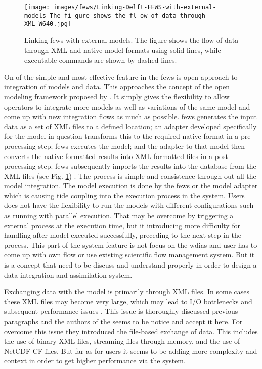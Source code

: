 \documentclass[a4paper,oneside,12pt]{report}
\begin{document}
\begin{figure}[htp]
    \centering
    \texttt{[image: images/fews/Linking-Delft-FEWS-with-external-models-The-fi-gure-shows-the-fl-ow-of-data-through-XML\_W640.jpg]}\\
    \caption{ Linking \acrshort{fews} with external models. The figure shows the flow of data through XML and native model formats using solid lines, while executable commands are shown by dashed lines. \cite{Werner2013TheSystem} }
    \label{fi:fews_general_adapter}
\end{figure}
On of the simple and most effective feature in the \acrshort{fews} is open approach to integration of models and data. This approaches the concept of the open modeling framework proposed by \cite{Kokkonen2003InterfacingXML}. It simply gives the flexibility to allow operators to integrate more models as well as variations of the same model and come up with new integration flows as much as possible.
\acrshort{fews} generates the input data as a set of XML files to a defined location; an adapter developed specifically for the model in question transforms this to the required native format in a pre-processing step; \acrshort{fews} executes the model; and the adapter to that model then converts the native formatted results into XML formatted files in a post processing step. \acrshort{fews} subsequently imports the results into the database from the XML files (see Fig. \ref{fi:fews_general_adapter}) \cite{Werner2013TheSystem}. The process is simple and consistence through out all the model integration. The model execution is done by the \acrshort{fews} or the model adapter which is causing tide coupling into the execution process in the system. Users does not have the flexibility to run the models with different configurations such as running with parallel execution. That may be overcome by triggering a external process at the execution time, but it introducing more difficulty for handling after model executed successfully, preceding to the next step in the process. This part of the system feature is not focus on the \acrshort{wdias} and user has to come up with own flow or use existing scientific flow management system. But it is a concept that need to be discuss and understand properly in order to design a data integration and assimilation system.

Exchanging data with the model is primarily through XML files. In some cases these XML files may become very large, which may lead to I/O bottlenecks and subsequent performance issues \cite{Werner2013TheSystem}. This issue is thoroughly discussed previous paragraphs and the authors of the \cite{Werner2013TheSystem} seems to be notice and accept it here. For overcome this issue they introduced the file-based exchange of data. This includes the use of binary-XML files, streaming files through memory, and the use of \acrshort{NetCDF}-CF files. But far as for users it seems to be adding more complexity and context in order to get higher performance via the system.
\end{document}
